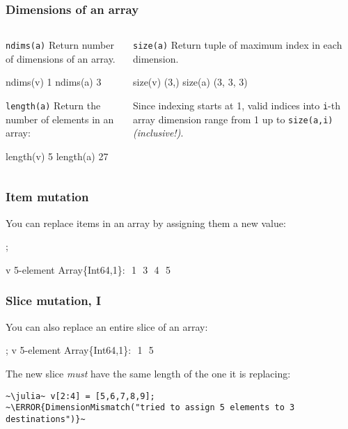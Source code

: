 \documentclass[english,serif,mathserif,xcolor=pdftex,dvipsnames,table]{beamer}
\begin{document}
\begin{frame}[fragile]
  \frametitle{Dimensions of an array}
  \smaller

  \begin{columns}
    \begin{column}{0.5\textwidth}
      \raggedright

  \begin{describe}{\texttt{ndims(a)}}
    Return number of dimensions of an array.
\begin{semiverbatim}
\julia ndims(v)
1
\julia ndims(a)
3
\end{semiverbatim}
  \end{describe}

  \begin{describe}{\texttt{length(a)}}
    Return the number of elements in an array:
\begin{semiverbatim}
\julia length(v)
5
\julia length(a)
27
\end{semiverbatim}
  \end{describe}
    \end{column}
    \begin{column}{0.5\textwidth}
      \raggedright

  \begin{describe}{\texttt{size(a)}}
    Return tuple of maximum index in each dimension.
\begin{semiverbatim}
\julia size(v)
(3,)
\julia size(a)
(3, 3, 3)
\end{semiverbatim}

    Since indexing starts at 1, valid indices into \lstinline|i|-th
    array dimension range from 1 up to \lstinline|size(a,i)|
    \emph{(inclusive!)}.
  \end{describe}
    \end{column}
  \end{columns}
\end{frame}


\begin{frame}[fragile]
  \frametitle{Item mutation}
  You can replace items in an array by assigning them
  a new value:
\begin{semiverbatim}
\julia {};

\julia v
5-element Array\{Int64,1\}:
 \,\,1
 \,\,3
 \,\,4
 \,\,5
\end{semiverbatim}
\end{frame}

\begin{frame}[fragile]
  \frametitle{Slice mutation, I}

You can also replace an entire slice of an array:
\begin{semiverbatim}
\julia {};
\julia v
5-element Array\{Int64,1\}:
 \,\,1
 \,\,5
\end{semiverbatim}

The new slice \emph{must} have the same length of the one it is replacing:
\begin{lstlisting}
~\julia~ v[2:4] = [5,6,7,8,9];
~\ERROR{DimensionMismatch("tried to assign 5 elements to 3 destinations")}~
\end{lstlisting}
\end{frame}
\end{document}
